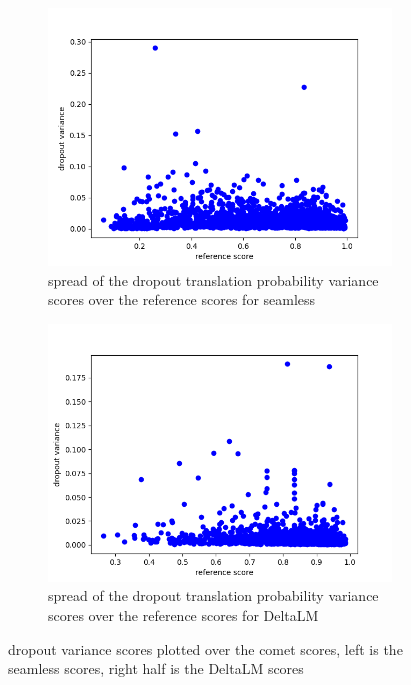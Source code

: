 \begin{figure}[ht]
        \centering%
        \begin{subfigure}{0.4\linewidth}
        \includegraphics[width=\textwidth]{Latex/sections/images/seamlessdropoutvariance.png}
        \caption{spread of the dropout translation probability variance scores over the reference scores for seamless}
    \end{subfigure}
    \begin{subfigure}{0.4\linewidth}
        \includegraphics[width=\textwidth]{Latex/sections/images/dlmdropoutvariance.png}
        \caption{spread of the dropout translation probability variance scores over the reference scores for DeltaLM}
    \end{subfigure}
        \caption{dropout variance scores plotted over the comet scores, left is the seamless scores, right half is the DeltaLM scores}
        \label{fig:dropout translation variance score}
\end{figure}
    
